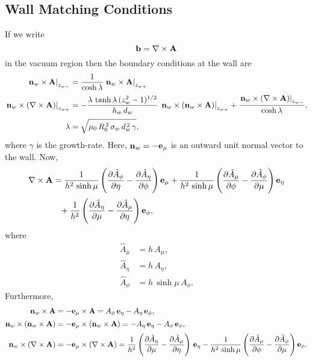 \documentclass[12pt,prb,aps,notitlepage]{revtex4-1}
\begin{document}
\subsection{Wall Matching Conditions}
If we write
\begin{equation}
{\bf b} = \nabla\times{\bf A}
\end{equation}
in the vacuum region then the boundary conditions at the wall are 
\begin{align}
\left.{\bf n}_w\times {\bf A}\right|_{z_{w-}} &= \frac{1}{\cosh\lambda}\left.{\bf n}_w\times {\bf A}\right|_{z_{w+}} \\[0.5ex]
\left.{\bf n}_w\times (\nabla\times{\bf A})\right|_{z_{w+}}&= -\frac{\lambda\,\tanh\lambda\,(z_w^2-1)^{1/2}}{h_w\,d_w}\,\left.{\bf n}_w\times({\bf n}_w\times{\bf A})\right|_{z_{w+}}+
\frac{\left.{\bf n}_w\times (\nabla\times{\bf A})\right|_{z_{w-}}}{\cosh\lambda},\\[0.5ex]
\lambda &=\sqrt{\mu_0\,R_0^{\,2}\,\sigma_w\,d_w^{\,2}\,\gamma},
\end{align}
where $\gamma$ is the growth-rate. Here, ${\bf n}_w= -{\bf e}_\mu$ is an outward unit normal vector to the wall. Now,
\begin{align}
\nabla\times{\bf A} &= \frac{1}{h^2\,\sinh\mu}\left(\frac{\partial \hat{A}_\phi}{\partial \eta}-\frac{\partial\hat{A}_\eta}{\partial\phi}\right){\bf e}_\mu
+  \frac{1}{h^2\,\sinh\mu}\left(\frac{\partial \hat{A}_\mu}{\partial \phi}-\frac{\partial\hat{A}_\phi}{\partial\mu}\right){\bf e}_\eta\nonumber\\[0.5ex]
&\phantom{=}
+\frac{1}{h^2}\left(\frac{\partial \hat{A}_\eta}{\partial \mu}-\frac{\partial\hat{A}_\mu}{\partial\eta}\right){\bf e}_\phi,
\end{align}
where
\begin{align}
\hat{A}_\mu &= h\,A_\mu,\\[0.5ex]
\hat{A}_\eta&= h\,A_\eta,\\[0.5ex]
\hat{A}_\phi &= h\,\sinh\mu\,A_\phi.
\end{align}
Furthermore,
\begin{align}
{\bf n}_w\times {\bf A} &= -{\bf e}_\mu\times {\bf A} = A_\phi\,{\bf e}_\eta - A_\eta\,{\bf e}_\phi,\\[0.5ex]
{\bf n}_w\times ({\bf n}_w\times {\bf A})&= -{\bf e}_\mu\times ({\bf n}_w\times {\bf A} )= -A_\eta\,{\bf e}_\eta-A_\phi\,{\bf e}_\phi,\\[0.5ex]
{\bf n}_w\times (\nabla\times {\bf A}) &= -{\bf e}_\mu\times(\nabla\times {\bf A}) = \frac{1}{h^2}\left(\frac{\partial \hat{A}_\eta}{\partial \mu}-\frac{\partial\hat{A}_\mu}{\partial\eta}\right)\,{\bf e}_\eta- \frac{1}{h^2\,\sinh\mu}\left(\frac{\partial \hat{A}_\mu}{\partial \phi}-\frac{\partial\hat{A}_\phi}{\partial\mu}\right){\bf e}_\phi.
\end{align}
\end{document}
